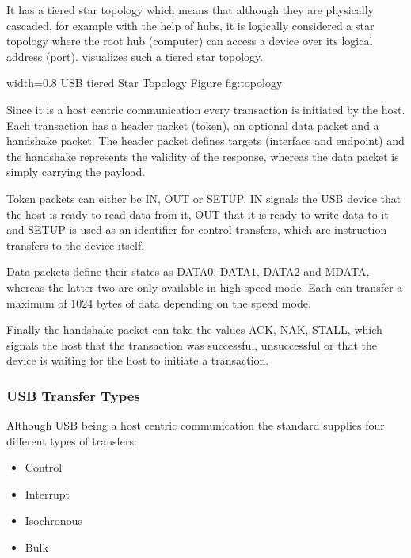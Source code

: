 It has a tiered star topology which means that although they are physically cascaded, for example with the help of hubs, it is logically considered a star topology where the 
root hub (computer) can access a device over its logical address (port).  visualizes such a tiered star topology.

 {width=0.8\textwidth}%
 {USB tiered Star Topology \cite{USBTOPOLOGY}}%
 {Figure}%
 {fig:topology}%
 
Since it is a host centric communication every transaction is initiated by the host. Each transaction has a header packet (token), an optional data 
packet and a handshake packet. The header packet defines targets (interface and endpoint) and the handshake represents the validity of the response, 
whereas the data packet is simply carrying the payload.

Token packets can either be IN, OUT or SETUP. IN signals the USB device that the host is ready to read data from it, OUT that it is ready to write data 
to it and SETUP is used as an identifier for control transfers, which are instruction transfers to the device itself.

Data packets define their states as DATA$0$, DATA$1$, DATA$2$ and MDATA, whereas the latter two are only available in high speed mode. Each can transfer a 
maximum of $1024$ bytes of data depending on the speed mode.

Finally the handshake packet can take the values ACK, NAK, STALL, which signals the host that the transaction was successful, unsuccessful or that the 
device is waiting for the host to initiate a transaction.%

\subsubsection{USB Transfer Types}

Although USB being a host centric communication the standard supplies four different types of transfers: 

\begin{itemize}
 \item Control
 \item Interrupt
 \item Isochronous
 \item Bulk
\end{itemize}


